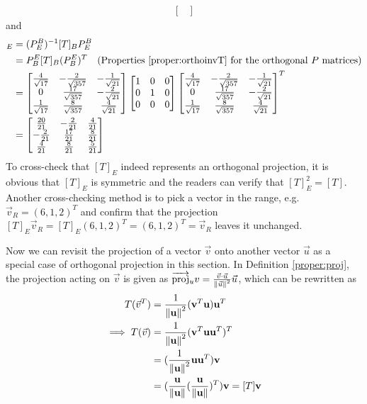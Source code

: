 \begin{solution}
\begin{align*}
\begin{bmatrix}
\end{bmatrix}
\end{align*}
and
\begin{align*}
[T]_E &= (P_E^B)^{-1} [T]_B P_E^B \\
&= P_B^E [T]_B (P_B^E)^T \text{\quad (Properties \ref{proper:orthoinvT} for the orthogonal $P$ matrices)} \\
&=
\begin{bmatrix}
\frac{4}{\sqrt{17}} & -\frac{2}{\sqrt{357}} & -\frac{1}{\sqrt{21}} \\
0 & \frac{17}{\sqrt{357}} & -\frac{2}{\sqrt{21}} \\
\frac{1}{\sqrt{17}} & \frac{8}{\sqrt{357}} & \frac{4}{\sqrt{21}}
\end{bmatrix}
\begin{bmatrix}
1 & 0 & 0 \\
0 & 1 & 0 \\
0 & 0 & 0
\end{bmatrix}
\begin{bmatrix}
\frac{4}{\sqrt{17}} & -\frac{2}{\sqrt{357}} & -\frac{1}{\sqrt{21}} \\
0 & \frac{17}{\sqrt{357}} & -\frac{2}{\sqrt{21}} \\
\frac{1}{\sqrt{17}} & \frac{8}{\sqrt{357}} & \frac{4}{\sqrt{21}}
\end{bmatrix}^T \\
&=
\begin{bmatrix}
\frac{20}{21}&-\frac{2}{21}&\frac{4}{21}\\ 
-\frac{2}{21}&\frac{17}{21}&\frac{8}{21}\\ 
\frac{4}{21}&\frac{8}{21}&\frac{5}{21}
\end{bmatrix}
\end{align*}
To cross-check that $[T]_E$ indeed represents an orthogonal projection, it is obvious that $[T]_E$ is symmetric and the readers can verify that $[T]_E^2 = [T]$. Another cross-checking method is to pick a vector in the range, e.g. $\vec{v}_R = (6,1,2)^T$ and confirm that the projection $[T]_E\vec{v}_R = [T]_E(6,1,2)^T = (6,1,2)^T = \vec{v}_R$ leaves it unchanged.
\end{solution}
Now we can revisit the projection of a vector $\vec{v}$ onto another vector $\vec{u}$ as a special case of orthogonal projection in this section. In Definition \ref{proper:proj}, the projection acting on $\vec{v}$ is given as $\overrightarrow{\text{proj}}_u v = \frac{\vec{v} \cdot \vec{u}}{\norm{\vec{u}}^2} \vec{u}$, which can be rewritten as
\begin{align*}
T(\vec{v}^T) &= \frac{1}{\norm{\textbf{u}}^2}(\textbf{v}^T\textbf{u})\textbf{u}^T \\
\implies T(\vec{v}) &= \frac{1}{\norm{\textbf{u}}^2}(\textbf{v}^T\textbf{u}\textbf{u}^T)^T \\
&= (\frac{1}{\norm{\textbf{u}}^2}\textbf{u}\textbf{u}^T)\textbf{v} \\
&= (\frac{\textbf{u}}{\norm{\textbf{u}}}(\frac{\textbf{u}}{\norm{\textbf{u}}})^T)\textbf{v} = [T]\textbf{v}
\end{align*}
